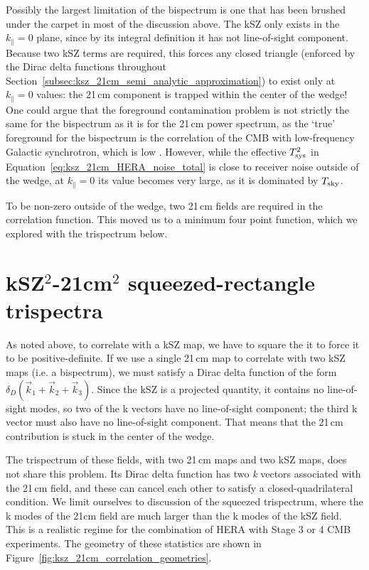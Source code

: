 Possibly the largest limitation of the bispectrum is one that has been brushed under the carpet in most of the discussion above. The kSZ only exists in the $k_{\parallel}=0$ plane, since by its integral definition it has not line-of-sight component. Because two kSZ terms are required, this forces any closed triangle (enforced by the Dirac delta functions throughout Section~\ref{subsec:ksz_21cm_semi_analytic_approximation}) to exist only at $k_{\parallel}=0$ values: the 21\,cm component is trapped within the center of the wedge! One could argue that the foreground contamination problem is not strictly the same for the bispectrum as it is for the 21\,cm power spectrum, as the `true' foreground for the bispectrum is the correlation of the CMB with low-frequency Galactic synchrotron, which is low \citep[e.g.][]{Ichiki.14}. However, while the effective $T^2_{\rm sys}$ in Equation~\ref{eq:ksz_21cm_HERA_noise_total} is close to receiver noise outside of the wedge, at $k_{\parallel}=0$ its value becomes very large, as it is dominated by $T_{\rm sky}$. 

To be non-zero outside of the wedge, two 21\,cm fields are required in the correlation function. This moved us to a minimum four point function, which we explored with the trispectrum below.

\section{kSZ$^2$-21cm$^2$ squeezed-rectangle trispectra}
\label{sec:trispec}

As noted above, to correlate with a kSZ map, we have to square the it to force it to be positive-definite. If we use a single 21\,cm map to correlate with two kSZ maps (i.e. a bispectrum), we must satisfy a Dirac delta function of the form $\delta_D(\vec{k}_1 + \vec{k}_2 + \vec{k}_3)$. Since the kSZ is a projected quantity, it contains no line-of-sight modes, so two of the k vectors have no line-of-sight component; the third k vector must also have no line-of-sight component. That means that the 21\,cm contribution is stuck in the center of the wedge.

The trispectrum of these fields, with two 21\,cm maps and two kSZ maps, does not share this problem. Its Dirac delta function has two \textit{k} vectors associated with the 21\,cm field, and these can cancel each other to satisfy a closed-quadrilateral condition. We limit ourselves to discussion of the squeezed trispectrum, where the k modes of the 21cm field are much larger than the k modes of the kSZ field. This is a realistic regime for the combination of HERA with Stage 3 or 4 CMB experiments. The geometry of these statistics are shown in Figure~\ref{fig:ksz_21cm_correlation_geometries}. 

